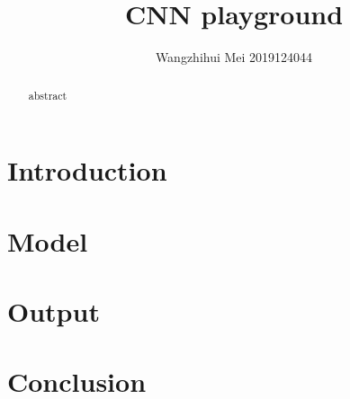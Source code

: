 \documentclass[11pt,en]{elegantpaper}
\title{CNN playground }
\author{Wangzhihui Mei 2019124044}
\institute{CCNU-UOW JI}
\date{}
\begin{document}
\maketitle

\begin{abstract}
	abstract
\end{abstract}

\section{Introduction}

\section{Model}

\section{Output}

\section{Conclusion}

% 
\end{document}
